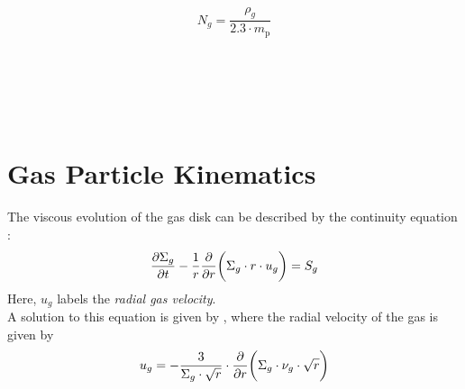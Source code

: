          \\

        \begin{equation}
            N_g
                =\frac{\rho_g}{2.3\cdot m_\text{p}}
        \end{equation}

         \\

         \\  %


        \newpage
         \\
         \\
        


\newpage\section{Gas Particle Kinematics}


    The viscous evolution of the gas disk can be described by the continuity equation 
    \cite{birnstiel_dullemond_brauer_2010}:
    \begin{equation}
        \frac{\partial \Sigma_g}{\partial t}-\frac{1}{r}\frac{\partial }{\partial r}\bigg(\Sigma_g \cdot r \cdot u_g\bigg) = S_g
    \end{equation}
    Here, $u_g$ labels the \textit{radial gas velocity}.
    \\

    A solution to this equation is given by \cite{lynden-bell_pringle_1974}, where the 
    radial velocity of the gas is given by
    \begin{equation}
        u_{g}
        =-\frac{3}{\Sigma_g\cdot\sqrt{r}}
            \cdot\frac{\partial }{\partial r}\bigg(\Sigma_g \cdot \nu_g \cdot \sqrt{r}\bigg)
    \end{equation}

